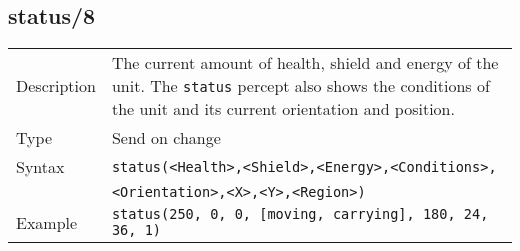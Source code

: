 \subsection{status/8}
\begin{tabularx}{\textwidth}{lX}
 Description & The current amount of health, shield and energy of the unit. The \verb|status| percept also shows the conditions of the unit and its current orientation and position. \\
 Type & Send on change \\
 Syntax & \verb|status(<Health>,<Shield>,<Energy>,<Conditions>,| \\
 & \quad \verb|<Orientation>,<X>,<Y>,<Region>)| \\
 Example & \verb|status(250, 0, 0, [moving, carrying], 180, 24, 36, 1)|   \\
 \end{tabularx}\\
